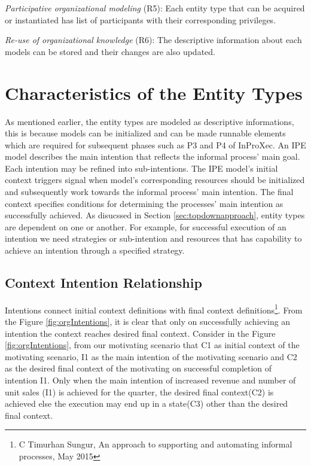 \textit{Participative organizational modeling} (R5): Each entity type that can be acquired or instantiated has list of participants with their corresponding privileges. 

\textit{Re-use of organizational knowledge} (R6): The descriptive information about each models can be stored and their changes are also updated. 
 
\section{Characteristics of the Entity Types}
\label{sec:enttyperelation}
As mentioned earlier, the entity types are modeled as descriptive informations, this is because models can be initialized and can be made runnable elements which are required for subsequent phases such as P3 and P4 of InProXec. An IPE model describes the main intention that reflects the informal process' main goal. Each intention may be refined into sub-intentions. The IPE model's initial context triggers signal when model's corresponding resources should be initialized and subsequently work towards the informal process' main intention\cite{Sungur2015a}. The final context specifies conditions for determining the processes' main intention as successfully achieved. As disucssed in Section \ref{sec:topdownapproach}, entity types are dependent on one or another. For example, for successful execution of an intention we need strategies or sub-intention and resources that has capability to achieve an intention through a specified strategy. 

\subsection{Context Intention Relationship}
\label{sec:ctxintrel}
Intentions connect initial context definitions with final context definitions\footnote{C Timurhan Sungur, An approach to supporting and automating informal processes, May 2015}. From the Figure \ref{fig:orgIntentions}, it is clear that only on successfully achieving an intention the context reaches desired final context. Consider in the Figure \ref{fig:orgIntentions}, from our motivating scenario that C1 as initial context of the motivating scenario, I1 as the main intention of the motivating scenario and C2 as the desired final context of the motivating on successful completion of intention I1. Only when the main intention of increased revenue and number of unit sales (I1) is achieved for the quarter, the desired final context(C2) is achieved else the execution may end up in a state(C3) other than the desired final context. 

